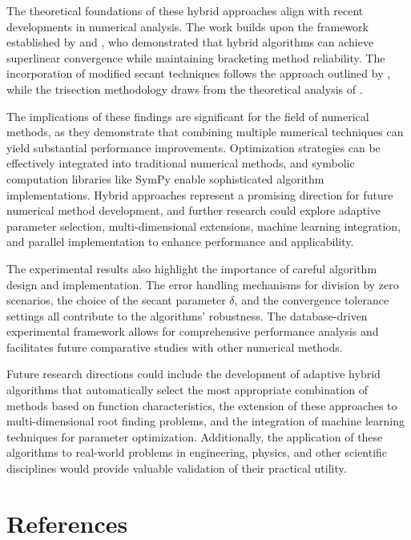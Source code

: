\documentclass[amsmath, amssymb, aps]{revtex4-2}
\begin{document}
The theoretical foundations of these hybrid approaches align with recent developments in numerical analysis. The work builds upon the framework established by \cite{sabharwal2019blended} and \cite{badr2022novel}, who demonstrated that hybrid algorithms can achieve superlinear convergence while maintaining bracketing method reliability. The incorporation of modified secant techniques follows the approach outlined by \cite{mathews2004numerical}, while the trisection methodology draws from the theoretical analysis of \cite{demir2008trisection}.

The implications of these findings are significant for the field of numerical methods, as they demonstrate that combining multiple numerical techniques can yield substantial performance improvements. Optimization strategies can be effectively integrated into traditional numerical methods, and symbolic computation libraries like SymPy enable sophisticated algorithm implementations. Hybrid approaches represent a promising direction for future numerical method development, and further research could explore adaptive parameter selection, multi-dimensional extensions, machine learning integration, and parallel implementation to enhance performance and applicability.

The experimental results also highlight the importance of careful algorithm design and implementation. The error handling mechanisms for division by zero scenarios, the choice of the secant parameter $\delta$, and the convergence tolerance settings all contribute to the algorithms' robustness. The database-driven experimental framework allows for comprehensive performance analysis and facilitates future comparative studies with other numerical methods.

Future research directions could include the development of adaptive hybrid algorithms that automatically select the most appropriate combination of methods based on function characteristics, the extension of these approaches to multi-dimensional root finding problems, and the integration of machine learning techniques for parameter optimization. Additionally, the application of these algorithms to real-world problems in engineering, physics, and other scientific disciplines would provide valuable validation of their practical utility.

\section*{References}
\end{document}
